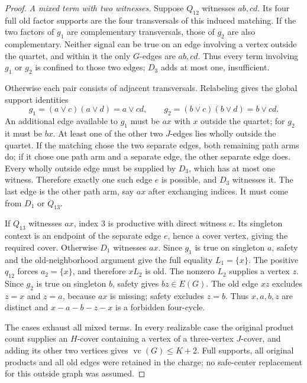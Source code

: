 \documentclass[11pt]{article}
\newcommand{\vc}{\operatorname{vc}}
\theoremstyle{definition}
\theoremstyle{remark}
\begin{document}
\begin{proof}
\emph{A mixed term with two witnesses.} Suppose $Q_{12}$ witnesses $ab,cd$. Its four full old factor supports are the four transversals of this induced matching. If the two factors of $g_1$ are complementary transversals, those of $g_2$ are also complementary. Neither signal can be true on an edge involving a vertex outside the quartet, and within it the only $G$-edges are $ab,cd$. Thus every term involving $g_1$ or $g_2$ is confined to those two edges; $D_3$ adds at most one, insufficient.

Otherwise each pair consists of adjacent transversals. Relabeling gives the global support identities
\[
g_1=(a\vee c)(a\vee d)=a\vee cd,
\qquad
g_2=(b\vee c)(b\vee d)=b\vee cd.
\]
An additional edge available to $g_1$ must be $ax$ with $x$ outside the quartet; for $g_2$ it must be $bx$. At least one of the other two $J$-edges lies wholly outside the quartet. If the matching chose the two separate edges, both remaining path arms do; if it chose one path arm and a separate edge, the other separate edge does. Every wholly outside edge must be supplied by $D_3$, which has at most one witness. Therefore exactly one such edge $e$ is possible, and $D_3$ witnesses it. The last edge is the other path arm, say $ax$ after exchanging indices. It must come from $D_1$ or $Q_{13}$.

If $Q_{13}$ witnesses $ax$, index $3$ is productive with direct witness $e$. Its singleton context is an endpoint of the separate edge $e$, hence a cover vertex, giving the required cover. Otherwise $D_1$ witnesses $ax$. Since $g_1$ is true on singleton $a$, safety and the old-neighborhood argument give the full equality $L_1=\{x\}$. The positive $q_{12}$ forces $a_2=\{x\}$, and therefore $xL_2$ is old. The nonzero $L_2$ supplies a vertex $z$. Since $g_2$ is true on singleton $b$, safety gives $bz\in E(G)$. The old edge $xz$ excludes $z=x$ and $z=a$, because $ax$ is missing; safety excludes $z=b$. Thus $x,a,b,z$ are distinct and $x-a-b-z-x$ is a forbidden four-cycle.

The cases exhaust all mixed terms. In every realizable case the original product count supplies an $H$-cover containing a vertex of a three-vertex $J$-cover, and adding its other two vertices gives $\vc(G)\le K+2$. Full supports, all original products and all old edges were retained in the charge; no safe-center replacement for this outside graph was assumed.
\end{proof}
\end{document}

